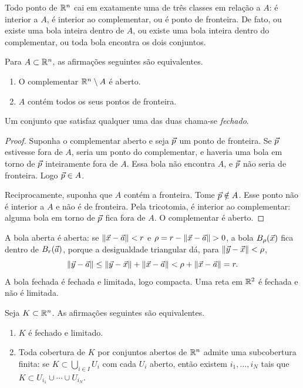 \documentclass[11pt,a4paper]{article}
\begin{document}
Todo ponto de $\mathbb{R}^n$ cai em exatamente uma de três classes em relação a $A$: é interior a $A$, é interior ao complementar, ou é ponto de fronteira. De fato, ou existe uma bola inteira dentro de $A$, ou existe uma bola inteira dentro do complementar, ou toda bola encontra os dois conjuntos.

\begin{teorema}
Para $A\subset\mathbb{R}^n$, as afirmações seguintes são equivalentes.
\begin{enumerate}[leftmargin=1.4em]
\item O complementar $\mathbb{R}^n\setminus A$ é aberto.
\item $A$ contém todos os seus pontos de fronteira.
\end{enumerate}
Um conjunto que satisfaz qualquer uma das duas chama-se \emph{fechado}.
\end{teorema}

\begin{proof}
Suponha o complementar aberto e seja $\vec{p}$ um ponto de fronteira. Se $\vec{p}$ estivesse fora de $A$, seria um ponto do complementar, e haveria uma bola em torno de $\vec{p}$ inteiramente fora de $A$. Essa bola não encontra $A$, e $\vec{p}$ não seria de fronteira. Logo $\vec{p}\in A$.

Reciprocamente, suponha que $A$ contém a fronteira. Tome $\vec{p}\notin A$. Esse ponto não é interior a $A$ e não é de fronteira. Pela tricotomia, é interior ao complementar: alguma bola em torno de $\vec{p}$ fica fora de $A$. O complementar é aberto.
\end{proof}

A bola aberta é aberta: se $\left\lVert \vec{x}-\vec{a} \right\rVert<r$ e $\rho=r-\left\lVert \vec{x}-\vec{a} \right\rVert>0$, a bola $B_\rho(\vec{x})$ fica dentro de $B_r(\vec{a})$, porque a desigualdade triangular dá, para $\left\lVert \vec{y}-\vec{x} \right\rVert<\rho$,
\[
\left\lVert \vec{y}-\vec{a} \right\rVert\le\left\lVert \vec{y}-\vec{x} \right\rVert+\left\lVert \vec{x}-\vec{a} \right\rVert<\rho+\left\lVert \vec{x}-\vec{a} \right\rVert=r.
\]
A bola fechada é fechada e limitada, logo compacta. Uma reta em $\mathbb{R}^2$ é fechada e não é limitada.

\begin{teorema}
Seja $K\subset\mathbb{R}^n$. As afirmações seguintes são equivalentes.
\begin{enumerate}[leftmargin=1.4em]
\item $K$ é fechado e limitado.
\item Toda cobertura de $K$ por conjuntos abertos de $\mathbb{R}^n$ admite uma subcobertura finita: se $K\subset\bigcup_{i\in I} U_i$ com cada $U_i$ aberto, então existem $i_1,\ldots,i_N$ tais que $K\subset U_{i_1}\cup\cdots\cup U_{i_N}$.
\end{enumerate}
\end{teorema}
\end{document}
